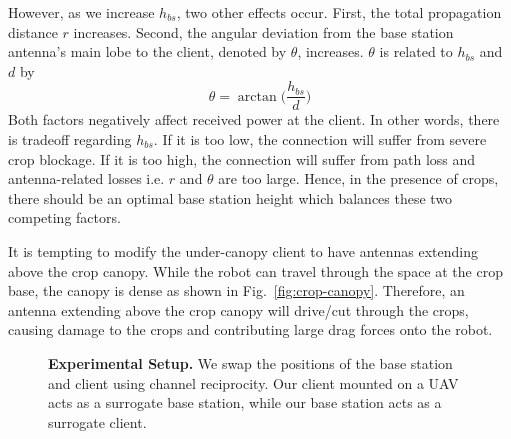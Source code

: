 However, as we increase $h_{bs}$, two other effects occur. First, the total propagation distance $r$ increases. Second, the angular deviation from the base station antenna's main lobe to the client, denoted by $\theta$, increases. $\theta$ is related to $h_{bs}$ and $d$  by \vspace{-0.20in}
\begin{equation}
\theta = \arctan\biggl(\frac{h_{bs}}{d}\biggr)
\end{equation}%
Both factors negatively affect received power at the client. In other words, there is tradeoff regarding $h_{bs}$. If it is too low, the connection will suffer from severe crop blockage. If it is too high, the connection will suffer from path loss and antenna-related losses i.e. $r$ and $\theta$ are too large. Hence, in the presence of crops, there should be an optimal base station height which balances these two competing factors.

 It is tempting to modify the under-canopy client to have antennas extending above the crop canopy. While the robot can travel through the space at the crop base, the canopy is dense as shown in Fig.~\ref{fig:crop-canopy}. Therefore, an antenna extending above the crop canopy will drive/cut through the crops, causing damage to the crops and contributing large drag forces onto the robot.

\begin{figure*}[!t] %
  \centering
  \hfill
  \hfill
  \vspace{-0.1in}
  \caption{\textbf{Experimental Setup.} We swap the positions of the base station and client using channel reciprocity. Our client mounted on a UAV acts as a surrogate base station, while our base station acts as a surrogate client.}
  \label{fig:experimental_setup}
\vspace{-0.25in}
\end{figure*}

